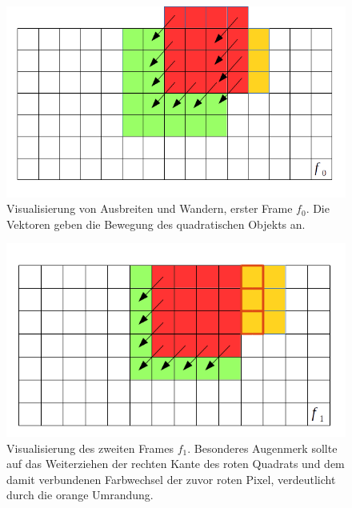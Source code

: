 
		\begin{figure}[H]
		\centering
		\includegraphics[width=0.7\linewidth]{../media/find-contours-spread-f0}
		\caption{Visualisierung von Ausbreiten und Wandern, erster Frame $f_0$. Die Vektoren geben die Bewegung des quadratischen Objekts an.}
		\label{fig:find-contours-spread-f0}
		\end{figure}
		\begin{figure}[H]
		\centering
		\includegraphics[width=0.7\linewidth]{../media/find-contours-spread-f1}
		\caption{Visualisierung des zweiten Frames $f_1$. Besonderes Augenmerk sollte auf das Weiterziehen der rechten Kante des roten Quadrats und dem damit verbundenen Farbwechsel der zuvor roten Pixel, verdeutlicht durch die orange Umrandung.}
		\label{fig:find-contours-spread-f1}
		\end{figure}


